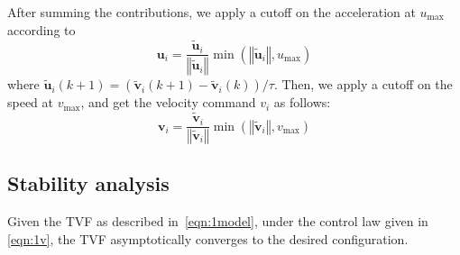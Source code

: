 After summing the contributions, we apply a cutoff on the acceleration at $u_\text{max}$ according to
\begin{equation}
    \mathbf{u}_i=\dfrac{\tilde{\mathbf{u}}_i}{\left\Vert\tilde{\mathbf{u}}_i\right\Vert}\min(\left\Vert\tilde{\mathbf{u}}_i\right\Vert, u_\text{max})
\end{equation}
where $\tilde{\mathbf{u}}_i(k+1) =(\tilde{\mathbf{v}}_i(k+1)-\tilde{\mathbf{v}}_i(k)) /\tau$. Then, we apply a cutoff on the speed at $v_\text{max}$, and get the velocity command $v_i$ as follows:
\begin{equation}
    \mathbf{v}_i=\dfrac{\tilde{\mathbf{v}}_i}{\left\Vert\tilde{\mathbf{v}}_i\right\Vert}\min(\left\Vert\tilde{\mathbf{v}}_i\right\Vert, v_\text{max})
\end{equation}

\subsection{Stability analysis}
\begin{theorem}\label{the:stability}
Given the TVF as described in~\eqref{eqn:1model}, under the control law given in \eqref{eqn:1v}, the TVF asymptotically converges to the desired configuration.
\end{theorem}
